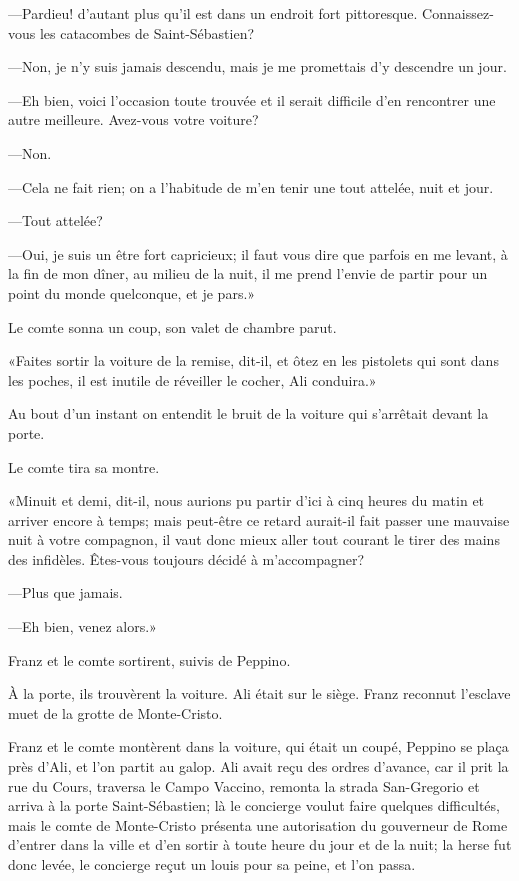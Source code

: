 —Pardieu! d'autant plus qu'il est dans un endroit fort pittoresque. Connaissez-vous les catacombes de Saint-Sébastien? 

—Non, je n'y suis jamais descendu, mais je me promettais d'y descendre un jour. 

—Eh bien, voici l'occasion toute trouvée et il serait difficile d'en rencontrer une autre meilleure. Avez-vous votre voiture? 

—Non. 

—Cela ne fait rien; on a l'habitude de m'en tenir une tout attelée, nuit et jour. 

—Tout attelée? 

—Oui, je suis un être fort capricieux; il faut vous dire que parfois en me levant, à la fin de mon dîner, au milieu de la nuit, il me prend l'envie de partir pour un point du monde quelconque, et je pars.» 

Le comte sonna un coup, son valet de chambre parut. 

«Faites sortir la voiture de la remise, dit-il, et ôtez en les pistolets qui sont dans les poches, il est inutile de réveiller le cocher, Ali conduira.» 

Au bout d'un instant on entendit le bruit de la voiture qui s'arrêtait devant la porte. 

Le comte tira sa montre. 

«Minuit et demi, dit-il, nous aurions pu partir d'ici à cinq heures du matin et arriver encore à temps; mais peut-être ce retard aurait-il fait passer une mauvaise nuit à votre compagnon, il vaut donc mieux aller tout courant le tirer des mains des infidèles. Êtes-vous toujours décidé à m'accompagner? 

—Plus que jamais. 

—Eh bien, venez alors.» 

Franz et le comte sortirent, suivis de Peppino. 

À la porte, ils trouvèrent la voiture. Ali était sur le siège. Franz reconnut l'esclave muet de la grotte de Monte-Cristo. 

Franz et le comte montèrent dans la voiture, qui était un coupé, Peppino se plaça près d'Ali, et l'on partit au galop. Ali avait reçu des ordres d'avance, car il prit la rue du Cours, traversa le Campo Vaccino, remonta la strada San-Gregorio et arriva à la porte Saint-Sébastien; là le concierge voulut faire quelques difficultés, mais le comte de Monte-Cristo présenta une autorisation du gouverneur de Rome d'entrer dans la ville et d'en sortir à toute heure du jour et de la nuit; la herse fut donc levée, le concierge reçut un louis pour sa peine, et l'on passa. 

